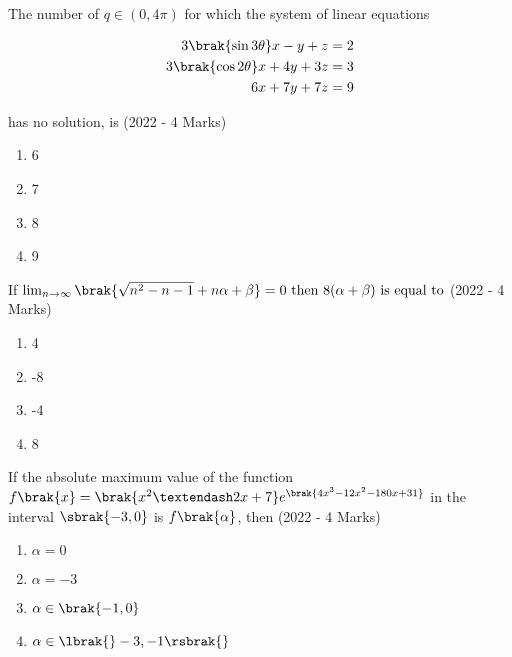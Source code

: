     \item{
     
            The number of $q \in (0, 4\pi)$ for which the system of linear equations
            
            \begin{align*}
            	3\brak{\sin 3\theta} x - y + z &= 2 \\
            	3\brak{\cos 2\theta} x + 4y + 3z &= 3 \\
            	6x + 7y + 7z &= 9
            \end{align*}
            
            has no solution, is \text{ }
            \hfill
            {(2022 - 4 Marks)}
            \begin{multicols}{4}
                \begin{enumerate}
                	\item 6
                	\item 7
                	\item 8
                	\item 9
                \end{enumerate}
            \end{multicols}
        
        }
    \item{
            If  $\lim_{n\rightarrow\infty}\brak{\sqrt{n^2-n-1}+n\alpha+\beta}=0 \text{ then } 8(\alpha + \beta) \text{ is equal to}$
           	\hfill
                {(2022 - 4 Marks)}
            
           \begin{multicols}{4}
            	\begin{enumerate}
            		\item 4
            		\item -8
            		\item -4
            		\item 8
            	\end{enumerate}
            \end{multicols}
        
        }
 	\item{
        	If the absolute maximum value of the function $f\brak{x} = \brak{x^2 – 2x + 7} e^{\brak{4x^3-12x^2-180x + 31}}$ in the interval $\sbrak{-3, 0}$ is $f\brak{\alpha}$, then
        	\hfill
        	{(2022 - 4 Marks)}
        	
        	\begin{multicols}{4}
        		\begin{enumerate}
        			\item $\alpha = 0$
        			\item $\alpha = -3$
        			\item $\alpha \in \brak{-1, 0}$
        			\item $\alpha \in \lbrak{}-3, -1\rsbrak{}$
        		\end{enumerate}
        	\end{multicols}
        	
        }

